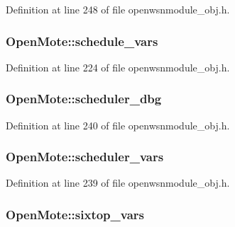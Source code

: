 Definition at line 248 of file openwsnmodule\+\_\+obj.\+h.

\subsubsection[{\texorpdfstring{schedule\+\_\+vars}{schedule_vars}}]{ Open\+Mote\+::schedule\+\_\+vars}\hypertarget{struct_open_mote_a0e4d8d8851e795fcee51cabfe38259cd}{}\label{struct_open_mote_a0e4d8d8851e795fcee51cabfe38259cd}


Definition at line 224 of file openwsnmodule\+\_\+obj.\+h.

\subsubsection[{\texorpdfstring{scheduler\+\_\+dbg}{scheduler_dbg}}]{ Open\+Mote\+::scheduler\+\_\+dbg}\hypertarget{struct_open_mote_a64bbadb0cb6de192bf1aece2a5d42580}{}\label{struct_open_mote_a64bbadb0cb6de192bf1aece2a5d42580}


Definition at line 240 of file openwsnmodule\+\_\+obj.\+h.

\subsubsection[{\texorpdfstring{scheduler\+\_\+vars}{scheduler_vars}}]{ Open\+Mote\+::scheduler\+\_\+vars}\hypertarget{struct_open_mote_a09fb00669f5bb4ac598ad50f789ea03c}{}\label{struct_open_mote_a09fb00669f5bb4ac598ad50f789ea03c}


Definition at line 239 of file openwsnmodule\+\_\+obj.\+h.

\subsubsection[{\texorpdfstring{sixtop\+\_\+vars}{sixtop_vars}}]{ Open\+Mote\+::sixtop\+\_\+vars}\hypertarget{struct_open_mote_ad24878ab2750f25cb31f1f1896df9129}{}\label{struct_open_mote_ad24878ab2750f25cb31f1f1896df9129}


